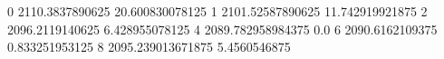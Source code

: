 0 2110.3837890625 20.600830078125
1 2101.52587890625 11.742919921875
2 2096.2119140625 6.428955078125
4 2089.782958984375 0.0
6 2090.6162109375 0.833251953125
8 2095.239013671875 5.4560546875

